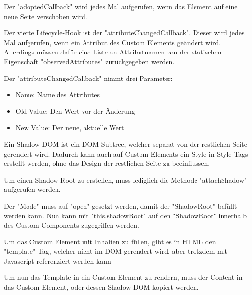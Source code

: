 
Der "adoptedCallback" wird jedes Mal aufgerufen, wenn das Element auf eine neue Seite verschoben wird.


Der vierte Lifecycle-Hook ist der "attributeChangedCallback". Dieser wird jedes Mal aufgerufen, wenn ein Attribut des Custom Elements geändert wird. Allerdings müssen dafür eine Liste an Attributnamen von der statischen Eigenschaft "observedAttributes" zurückgegeben werden. 
    
Der "attributeChangedCallback" nimmt drei Parameter:
\begin{itemize}
    \item 	Name: Name des Attributes
    \item 	Old Value: Den Wert vor der Änderung
    \item 	New Value: Der neue, aktuelle Wert 
\end{itemize}


\pagebreak
{}

Ein Shadow DOM ist ein DOM Subtree, welcher separat von der restlichen Seite gerendert wird. Dadurch kann auch auf Custom Elements ein Style in Style-Tags erstellt werden, ohne das Design der restlichen Seite zu beeinflussen.

Um einen Shadow Root zu erstellen, muss lediglich die Methode "attachShadow" aufgerufen werden. 


Der "Mode" muss auf "open" gesetzt werden, damit der "ShadowRoot" befüllt werden kann. Nun kann mit "this.shadowRoot" auf den "ShadowRoot" innerhalb des Custom Components zugegriffen werden.
\cite{MDNShadowRoot}

\pagebreak
{}

Um das Custom Element mit Inhalten zu füllen, gibt es in HTML den "template"-Tag, welcher nicht im DOM gerendert wird, aber trotzdem mit Javascript referenziert werden kann. 


Um nun das Template in ein Custom Element zu rendern, muss der Content in das Custom Element, oder dessen Shadow DOM kopiert werden.

